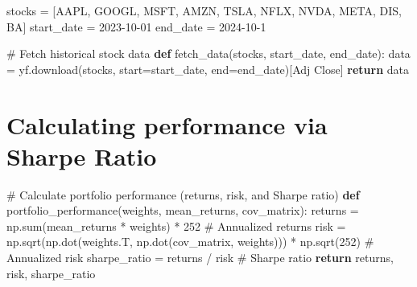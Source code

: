 \documentclass[
  letterpaper,
  DIV=11,
  numbers=noendperiod]{scrreprt}
\newenvironment{Shaded}{\begin{snugshade}}{\end{snugshade}}
\newcommand{\BuiltInTok}[1]{\textcolor[rgb]{0.00,0.23,0.31}{#1}}
\newcommand{\CommentTok}[1]{\textcolor[rgb]{0.37,0.37,0.37}{#1}}
\newcommand{\ControlFlowTok}[1]{\textcolor[rgb]{0.00,0.23,0.31}{\textbf{#1}}}
\newcommand{\DecValTok}[1]{\textcolor[rgb]{0.68,0.00,0.00}{#1}}
\newcommand{\KeywordTok}[1]{\textcolor[rgb]{0.00,0.23,0.31}{\textbf{#1}}}
\newcommand{\NormalTok}[1]{\textcolor[rgb]{0.00,0.23,0.31}{#1}}
\newcommand{\OperatorTok}[1]{\textcolor[rgb]{0.37,0.37,0.37}{#1}}
\newcommand{\StringTok}[1]{\textcolor[rgb]{0.13,0.47,0.30}{#1}}
\begin{document}
\begin{Shaded}
\begin{Highlighting}[]
\NormalTok{stocks }\OperatorTok{=}\NormalTok{ [}\StringTok{\textquotesingle{}AAPL\textquotesingle{}}\NormalTok{, }\StringTok{\textquotesingle{}GOOGL\textquotesingle{}}\NormalTok{, }\StringTok{\textquotesingle{}MSFT\textquotesingle{}}\NormalTok{, }\StringTok{\textquotesingle{}AMZN\textquotesingle{}}\NormalTok{, }\StringTok{\textquotesingle{}TSLA\textquotesingle{}}\NormalTok{, }\StringTok{\textquotesingle{}NFLX\textquotesingle{}}\NormalTok{, }\StringTok{\textquotesingle{}NVDA\textquotesingle{}}\NormalTok{, }\StringTok{\textquotesingle{}META\textquotesingle{}}\NormalTok{, }\StringTok{\textquotesingle{}DIS\textquotesingle{}}\NormalTok{, }\StringTok{\textquotesingle{}BA\textquotesingle{}}\NormalTok{] }
\NormalTok{start\_date }\OperatorTok{=} \StringTok{\textquotesingle{}2023{-}10{-}01\textquotesingle{}}
\NormalTok{end\_date }\OperatorTok{=} \StringTok{\textquotesingle{}2024{-}10{-}1\textquotesingle{}}

\CommentTok{\# Fetch historical stock data}
\KeywordTok{def}\NormalTok{ fetch\_data(stocks, start\_date, end\_date):}
\NormalTok{    data }\OperatorTok{=}\NormalTok{ yf.download(stocks, start}\OperatorTok{=}\NormalTok{start\_date, end}\OperatorTok{=}\NormalTok{end\_date)[}\StringTok{\textquotesingle{}Adj Close\textquotesingle{}}\NormalTok{]}
    \ControlFlowTok{return}\NormalTok{ data}
\end{Highlighting}
\end{Shaded}

\section{Calculating performance via Sharpe
Ratio}\label{calculating-performance-via-sharpe-ratio}

\begin{Shaded}
\begin{Highlighting}[]
\CommentTok{\# Calculate portfolio performance (returns, risk, and Sharpe ratio)}
\KeywordTok{def}\NormalTok{ portfolio\_performance(weights, mean\_returns, cov\_matrix):}
\NormalTok{    returns }\OperatorTok{=}\NormalTok{ np.}\BuiltInTok{sum}\NormalTok{(mean\_returns }\OperatorTok{*}\NormalTok{ weights) }\OperatorTok{*} \DecValTok{252}  \CommentTok{\# Annualized returns}
\NormalTok{    risk }\OperatorTok{=}\NormalTok{ np.sqrt(np.dot(weights.T, np.dot(cov\_matrix, weights))) }\OperatorTok{*}\NormalTok{ np.sqrt(}\DecValTok{252}\NormalTok{)  }\CommentTok{\# Annualized risk}
\NormalTok{    sharpe\_ratio }\OperatorTok{=}\NormalTok{ returns }\OperatorTok{/}\NormalTok{ risk  }\CommentTok{\# Sharpe ratio}
    \ControlFlowTok{return}\NormalTok{ returns, risk, sharpe\_ratio}
\end{Highlighting}
\end{Shaded}
\end{document}
